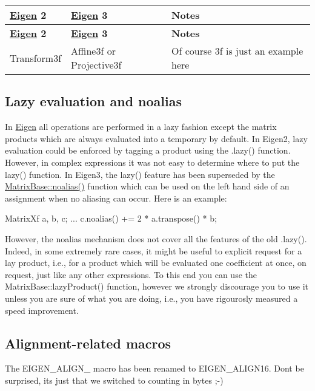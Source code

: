 \tabulinesep=1mm
\begin{longtabu} spread 0pt [c]{*{3}{|X[-1]}|}
\hline
\rowcolor{\tableheadbgcolor}\textbf{ \hyperlink{namespace_eigen}{Eigen} 2}&\textbf{ \hyperlink{namespace_eigen}{Eigen} 3}&\textbf{ Notes }\\
\endfirsthead
\hline
\endfoot
\hline
\rowcolor{\tableheadbgcolor}\textbf{ \hyperlink{namespace_eigen}{Eigen} 2}&\textbf{ \hyperlink{namespace_eigen}{Eigen} 3}&\textbf{ Notes }\\
\endhead
Transform3f  &Affine3f or Projective3f  &Of course 3f is just an example here   \\
\end{longtabu}
\hypertarget{_eigen2_to_eigen3_LazyVsNoalias}{}\subsection{Lazy evaluation and noalias}\label{_eigen2_to_eigen3_LazyVsNoalias}
In \hyperlink{namespace_eigen}{Eigen} all operations are performed in a lazy fashion except the matrix products which are always evaluated into a temporary by default. In Eigen2, lazy evaluation could be enforced by tagging a product using the .lazy() function. However, in complex expressions it was not easy to determine where to put the lazy() function. In Eigen3, the lazy() feature has been superseded by the \hyperlink{group___core___module_a2c1085de7645f23f240876388457da0b}{Matrix\+Base\+::noalias()} function which can be used on the left hand side of an assignment when no aliasing can occur. Here is an example\+: 
\begin{DoxyCode}
MatrixXf a, b, c;
...
c.noalias() += 2 * a.transpose() * b;
\end{DoxyCode}
 However, the noalias mechanism does not cover all the features of the old .lazy(). Indeed, in some extremely rare cases, it might be useful to explicit request for a lay product, i.\+e., for a product which will be evaluated one coefficient at once, on request, just like any other expressions. To this end you can use the Matrix\+Base\+::lazy\+Product() function, however we strongly discourage you to use it unless you are sure of what you are doing, i.\+e., you have rigourosly measured a speed improvement.\hypertarget{_eigen2_to_eigen3_AlignMacros}{}\subsection{Alignment-\/related macros}\label{_eigen2_to_eigen3_AlignMacros}
The E\+I\+G\+E\+N\+\_\+\+A\+L\+I\+G\+N\+\_ macro has been renamed to E\+I\+G\+E\+N\+\_\+\+A\+L\+I\+G\+N16. Don\textquotesingle{}t be surprised, it\textquotesingle{}s just that we switched to counting in bytes ;-\/)

